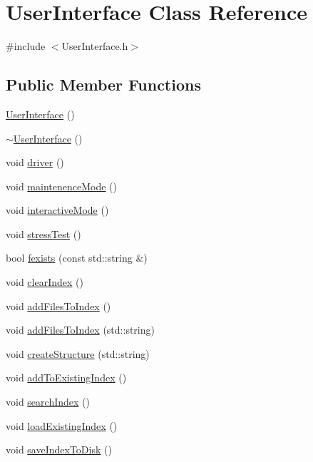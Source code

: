 \hypertarget{class_user_interface}{}\section{User\+Interface Class Reference}
\label{class_user_interface}


{\ttfamily \#include $<$User\+Interface.\+h$>$}

\subsection*{Public Member Functions}
\begin{DoxyCompactItemize}
\item 
\hyperlink{class_user_interface_ae6fb70370701b3bd6120e923df9705b0}{User\+Interface} ()
\item 
\hyperlink{class_user_interface_ae588b2ff1711a016dd4c6fc5002c0841}{$\sim$\+User\+Interface} ()
\item 
void \hyperlink{class_user_interface_a5f668ba7e20441556650a2ab57919eb8}{driver} ()
\item 
void \hyperlink{class_user_interface_aef424faaaab1a26e7e95615953dfb6b5}{maintenence\+Mode} ()
\item 
void \hyperlink{class_user_interface_a31406e8b5be6361c5e45f4f9b873c995}{interactive\+Mode} ()
\item 
void \hyperlink{class_user_interface_a0e9d6f1de4247604921f008ad8fd488b}{stress\+Test} ()
\item 
bool \hyperlink{class_user_interface_a37643889f4a4b9819de019bc15e72948}{fexists} (const std\+::string \&)
\item 
void \hyperlink{class_user_interface_ac6235e19919c71faf514f82ae89b922f}{clear\+Index} ()
\item 
void \hyperlink{class_user_interface_a5aae71a73a68b9876c5ce7b1cba54910}{add\+Files\+To\+Index} ()
\item 
void \hyperlink{class_user_interface_aebffed781877f0ecdd135e522d2088db}{add\+Files\+To\+Index} (std\+::string)
\item 
void \hyperlink{class_user_interface_a6069a7281cd1121e14fd863c9f29d5b9}{create\+Structure} (std\+::string)
\item 
void \hyperlink{class_user_interface_a141bf602a34bc9e85176bf05f3889ad2}{add\+To\+Existing\+Index} ()
\item 
void \hyperlink{class_user_interface_a742f2c3a61e2cb2c33d64eaf2f0de90a}{search\+Index} ()
\item 
void \hyperlink{class_user_interface_af25b22eab027dd3f7f46fddd26ac90a7}{load\+Existing\+Index} ()
\item 
void \hyperlink{class_user_interface_a71470a409a664aa9b83278c182b31444}{save\+Index\+To\+Disk} ()
\end{DoxyCompactItemize}



